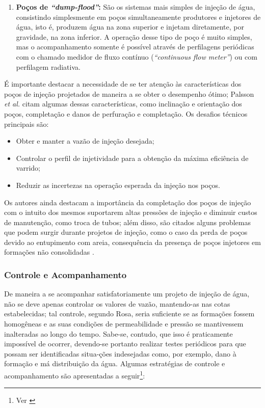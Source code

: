 \begin{enumerate}
\item \textbf{Po\c{c}os de \textit{``dump-flood''}:} S\~{a}o os sistemas mais simples de inje\c{c}\~{a}o de \'{a}gua, consistindo simplesmente em po\c{c}os simultaneamente produtores e injetores de \'{a}gua, isto \'{e}, produzem \'{a}gua na zona superior e injetam diretamente, por gravidade, na zona inferior. A opera\c{c}\~{a}o desse tipo de po\c{c}o \'{e} muito simples, mas o acompanhamento somente \'{e} poss\'{i}vel atrav\'{e}s de perfilagens peri\'{o}dicas com o chamado
medidor de fluxo cont\'{i}nuo (\textit{``continuous flow meter''}) ou com perfilagem radiativa.
\end{enumerate}

\'{E} importante destacar a necessidade de se ter aten\c{c}\~{a}o \`{a}s caracter\'{i}sticas dos po\c{c}os de inje\c{c}\~{a}o projetados de maneira a se obter o desempenho \'{o}timo; Palsson \textit{et al.} citam algumas dessas caracter\'{i}sticas, como inclina\c{c}\~{a}o e orienta\c{c}\~{a}o dos po\c{c}os, completa\c{c}\~{a}o e danos de perfura\c{c}\~{a}o e completa\c{c}\~{a}o. Os desafios t\'{e}cnicos principais s\~{a}o:

\begin{itemize}
	\item Obter e manter a vaz\~{a}o de inje\c{c}\~{a}o desejada;
	\item Controlar o perfil de injetividade para a obten\c{c}\~{a}o da m\'{a}xima efici\^{e}ncia de varrido;
	\item Reduzir as incertezas na opera\c{c}\~{a}o esperada da inje\c{c}\~{a}o nos po\c{c}os.
\end{itemize}

Os autores ainda destacam a import\^{a}ncia da completa\c{c}\~{a}o dos po\c{c}os de inje\c{c}\~{a}o com o intuito dos mesmos suportarem altas press\~{o}es de inje\c{c}\~{a}o e diminuir custos de manuten\c{c}\~{a}o, como troca de tubos; al\'{e}m disso, s\~{a}o citados alguns problemas que podem surgir durante projetos de inje\c{c}\~{a}o, como o caso da perda de po\c{c}os devido ao entupimento com areia, consequ\^{e}ncia da presen\c{c}a de po\c{c}os injetores em forma\c{c}\~{o}es n\~{a}o consolidadas \cite{PALSSON2003333}. 

\subsubsection{Controle e Acompanhamento}
De maneira a se acompanhar satisfatoriamente um projeto de inje\c{c}\~{a}o de \'{a}gua, n\~{a}o se deve apenas controlar os valores de vaz\~{a}o, mantendo-as nas cotas estabelecidas; tal controle, segundo Rosa, seria suficiente se as forma\c{c}\~{o}es fossem homog\^{e}neas e as suas condi\c{c}\~{o}es de permeabilidade e press\~{a}o se mantivessem inalteradas ao longo do tempo. Sabe-se, contudo, que isso \'{e} praticamente imposs\'{i}vel de ocorrer, devendo-se portanto realizar testes peri\'{o}dicos para que possam ser identificadas situa-\c{c}\~{o}es indesejadas como, por exemplo, dano \`{a} forma\c{c}\~{a}o e m\'{a} distribui\c{c}\~{a}o da \'{a}gua. Algumas estrat\'{e}gias de controle e acompanhamento s\~{a}o apresentadas a seguir\footnote{Ver \cite[pp. 659-662]{engres}}:

